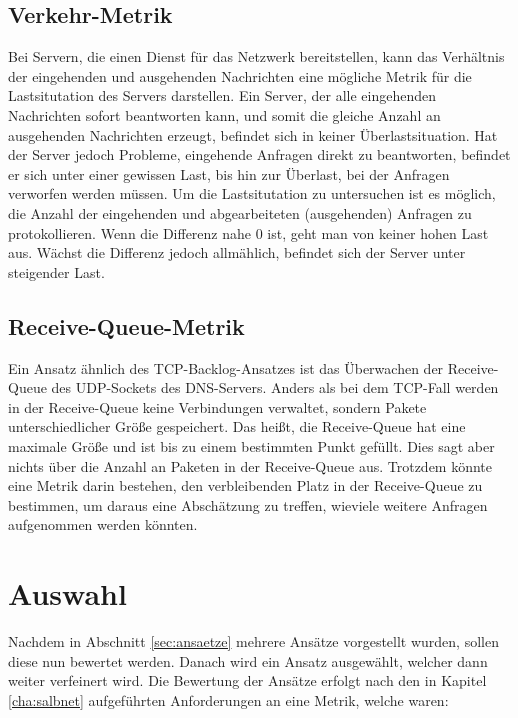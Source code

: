 \documentclass[a4paper, 12pt, BCOR10mm, DIV12, toc=bibliography, toc=listof, german]{scrbook}
\begin{document}
		\subsection*{Verkehr-Metrik} %

		Bei Servern, die einen Dienst für das Netzwerk bereitstellen, kann das Verhältnis der
		eingehenden und ausgehenden Nachrichten eine mögliche Metrik für die Lastsitutation des Servers
		darstellen.  Ein Server, der alle eingehenden Nachrichten sofort beantworten kann, und somit die
		gleiche Anzahl an ausgehenden Nachrichten erzeugt, befindet sich in keiner Überlastsituation.
		Hat der Server jedoch Probleme, eingehende Anfragen direkt zu beantworten, befindet er sich
		unter einer gewissen Last, bis hin zur Überlast, bei der Anfragen verworfen werden müssen. Um
		die Lastsitutation zu untersuchen ist es möglich, die Anzahl der eingehenden und abgearbeiteten
		(ausgehenden) Anfragen zu protokollieren. Wenn die Differenz nahe 0 ist, geht man von keiner
		hohen Last aus.  Wächst die Differenz jedoch allmählich, befindet sich der Server unter
		steigender Last.


		\subsection*{Receive-Queue-Metrik} %

		Ein Ansatz ähnlich des TCP-Backlog-Ansatzes \cite{zinke2007,scsczile2008} ist das Überwachen
		der Receive-Queue des UDP-Sockets des DNS-Servers. Anders als bei dem TCP-Fall werden in
		der Receive-Queue keine Verbindungen verwaltet, sondern Pakete unterschiedlicher Größe
		gespeichert. Das heißt, die Receive-Queue hat eine maximale Größe und ist bis zu einem
		bestimmten Punkt gefüllt. Dies sagt aber nichts über die Anzahl an Paketen in der Receive-Queue
		aus.  Trotzdem könnte eine Metrik darin bestehen, den verbleibenden Platz in der Receive-Queue
		zu bestimmen, um daraus eine Abschätzung zu treffen, wieviele weitere Anfragen aufgenommen
		werden könnten.

		

		\section{Auswahl} %
		\label{sec:auswahl}

		Nachdem in Abschnitt \ref{sec:ansaetze} mehrere Ansätze vorgestellt wurden, sollen diese nun
		bewertet werden. Danach wird ein Ansatz ausgewählt, welcher dann weiter verfeinert wird. Die
		Bewertung der Ansätze erfolgt nach den in Kapitel \ref{cha:salbnet} aufgeführten Anforderungen
		an eine Metrik, welche waren:
\end{document}
